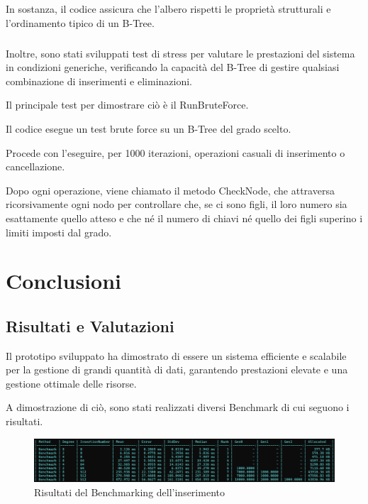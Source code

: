 \documentclass[12pt,a4paper,openright,twoside]{book}
\begin{document}
            In sostanza, il codice assicura che l'albero rispetti le proprietà strutturali e l'ordinamento tipico di un B-Tree.

            \paragraph*{}

            Inoltre, sono stati sviluppati test di stress per valutare le prestazioni del sistema in condizioni generiche, verificando la capacità del B-Tree di gestire qualsiasi combinazione di inserimenti e eliminazioni.

            Il principale test per dimostrare ciò è il RunBruteForce.

            

            Il codice esegue un test brute force su un B-Tree del grado scelto.

            Procede con l'eseguire, per 1000 iterazioni, operazioni casuali di inserimento o cancellazione.

            Dopo ogni operazione, viene chiamato il metodo CheckNode, che attraversa ricorsivamente ogni nodo per controllare che, se ci sono figli, il loro numero sia esattamente quello atteso e che né il numero di chiavi né quello dei figli superino i limiti imposti dal grado.

\chapter{Conclusioni}

    \section{Risultati e Valutazioni}
        Il prototipo sviluppato ha dimostrato di essere un sistema efficiente e scalabile per la gestione di grandi quantità di dati, garantendo prestazioni elevate e una gestione ottimale delle risorse.

        A dimostrazione di ciò, sono stati realizzati diversi Benchmark di cui seguono i risultati.

        \begin{figure} [h]
            \centering
            \includegraphics[width=1\linewidth]{figures/BenchmarkInsertion.png}
            \caption{Risultati del Benchmarking dell'inserimento}
            \label{fig:benchmark}
        \end{figure}
\end{document}
